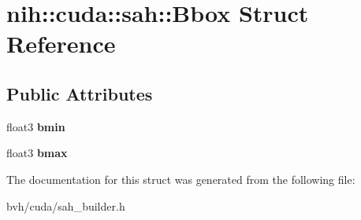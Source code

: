 \hypertarget{structnih_1_1cuda_1_1sah_1_1_bbox}{
\section{nih\-:\-:cuda\-:\-:sah\-:\-:\-Bbox \-Struct \-Reference}
\label{structnih_1_1cuda_1_1sah_1_1_bbox}
}
\subsection*{\-Public \-Attributes}
\begin{DoxyCompactItemize}
\item 
\hypertarget{structnih_1_1cuda_1_1sah_1_1_bbox_a8c21e7dd978c870d9d9d7b6b139d59a4}{
float3 {\bfseries bmin}}
\label{structnih_1_1cuda_1_1sah_1_1_bbox_a8c21e7dd978c870d9d9d7b6b139d59a4}

\item 
\hypertarget{structnih_1_1cuda_1_1sah_1_1_bbox_a991ba9a48ad4c6e02dfb92731ede9111}{
float3 {\bfseries bmax}}
\label{structnih_1_1cuda_1_1sah_1_1_bbox_a991ba9a48ad4c6e02dfb92731ede9111}

\end{DoxyCompactItemize}


\-The documentation for this struct was generated from the following file\-:\begin{DoxyCompactItemize}
\item 
bvh/cuda/sah\-\_\-builder.\-h\end{DoxyCompactItemize}
